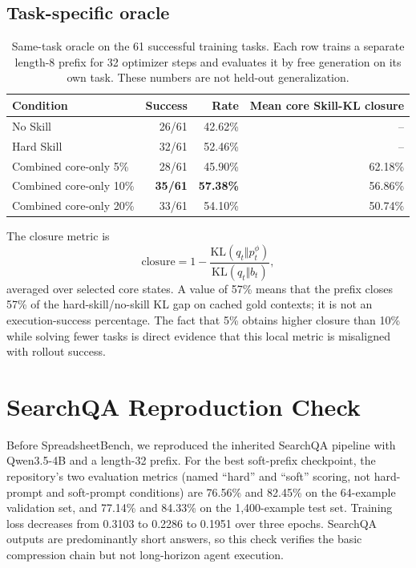 \subsection{Task-specific oracle}

\begin{table}[h]
\caption{Same-task oracle on the 61 successful training tasks.  Each row trains a separate length-8 prefix for 32 optimizer steps and evaluates it by free generation on its own task.  These numbers are not held-out generalization.}
\centering
\small
\begin{tabular}{lrrr}
\toprule
Condition & Success & Rate & Mean core Skill-KL closure \\
\midrule
No Skill & 26/61 & 42.62\% & -- \\
Hard Skill & 32/61 & 52.46\% & -- \\
Combined core-only 5\% & 28/61 & 45.90\% & 62.18\% \\
Combined core-only 10\% & \textbf{35/61} & \textbf{57.38\%} & 56.86\% \\
Combined core-only 20\% & 33/61 & 54.10\% & 50.74\% \\
\bottomrule
\end{tabular}
\end{table}

The closure metric is
\begin{equation}
\mathrm{closure}=1-
\frac{\mathrm{KL}(q_t\Vert p_t^\phi)}{\mathrm{KL}(q_t\Vert b_t)},
\end{equation}
averaged over selected core states.  A value of 57\% means that the prefix closes 57\% of the hard-skill/no-skill KL gap on cached gold contexts; it is not an execution-success percentage.  The fact that 5\% obtains higher closure than 10\% while solving fewer tasks is direct evidence that this local metric is misaligned with rollout success.

\section{SearchQA Reproduction Check}
\label{app:searchqa}

Before SpreadsheetBench, we reproduced the inherited SearchQA pipeline with Qwen3.5-4B and a length-32 prefix.  For the best soft-prefix checkpoint, the repository's two evaluation metrics (named ``hard'' and ``soft'' scoring, not hard-prompt and soft-prompt conditions) are 76.56\% and 82.45\% on the 64-example validation set, and 77.14\% and 84.33\% on the 1,400-example test set.  Training loss decreases from 0.3103 to 0.2286 to 0.1951 over three epochs.  SearchQA outputs are predominantly short answers, so this check verifies the basic compression chain but not long-horizon agent execution.

